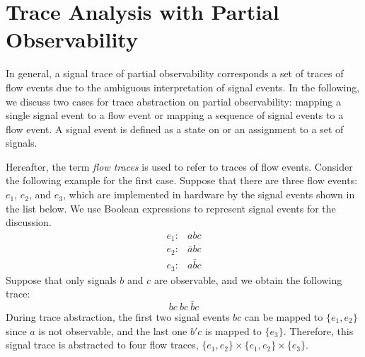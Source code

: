 \documentclass[conference]{IEEEtran}
\begin{document}



\section{Trace Analysis with Partial Observability}



In general, a signal trace of partial observability
corresponds a set of traces of flow events due to the
ambiguous interpretation of signal events.  In the
following, we discuss two cases for trace abstraction on
partial observability: mapping a single signal event to a
flow event or mapping a sequence of signal events to a flow
event.  A signal event is defined as a state on or an
assignment to a set of signals.

Hereafter, the term {\em flow traces} is used to refer to
traces of flow events.  Consider the following example for
the first case.  Suppose that there are three flow events:
$e_1$, $e_2$, and $e_3$, which are implemented in hardware
by the signal events shown in the list below.  We use
Boolean expressions to represent signal events for the
discussion.
\[
\begin{array}{cl}
e_1: & abc\\
e_2: & \bar{a}bc\\
e_3: & a\bar{b}c
\end{array}
\] 
Suppose that only signals $b$ and $c$ are observable, and we
obtain the following trace:
\[
bc\ bc \ \bar{b}c
\]
During trace abstraction, the first two signal events $bc$
can be mapped to $\{e_1, e_2\}$ since $a$ is not observable,
and the last one $b'c$ is mapped to $\{e_3\}$.  Therefore,
this signal trace is abstracted to four flow traces, $\{e_1,
e_2\} \times \{e_1, e_2\} \times \{e_3\}$.
\end{document}
